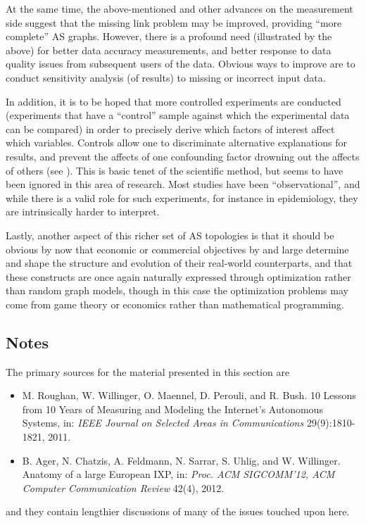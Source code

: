 At the same time, the above-mentioned and other advances on the measurement side
suggest that the missing link problem may be improved, providing
``more complete'' AS graphs. However, there is a profound need
(illustrated by the above) for better data accuracy measurements, and
better response to data quality issues from subsequent users of the
data. Obvious ways to improve are to conduct sensitivity analysis (of
results) to missing or incorrect input data. 

In addition, it is to be hoped that more controlled experiments are
conducted (\ie experiments that have a ``control'' sample against
which the experimental data can be compared) in order to precisely
derive which factors of interest affect which variables.  Controls
allow one to discriminate alternative explanations for results, and
prevent the affects of one confounding factor drowning out the affects
of others (see \cite{mao03:_bgp_beacon,bush09:_inter_optom}). This is
basic tenet of the scientific method, but seems to have been ignored
in this area of research. Most studies have been ``observational'',
and while there is a valid role for such experiments, for instance in
epidemiology, they are intrinsically harder to interpret.

Lastly, another aspect of this richer set of AS topologies is that it should be
obvious by now that economic or commercial objectives by and large determine
and shape the structure and evolution of their real-world counterparts, and that 
these constructs are once again naturally expressed through optimization rather 
than random graph models, though in this case the optimization problems may come
from game theory or economics rather than mathematical programming. 

\subsection{Notes}

The primary sources for the material presented in this section are

\begin{itemize}

\item[\cite{roughan11}] M. Roughan, W. Willinger, O. Maennel,
D. Perouli, and R. Bush. 10 Lessons from 10 Years of Measuring and Modeling the Internet's Autonomous Systems, in: {\em IEEE Journal on Selected Areas in Communications} 29(9):1810-1821, 2011.

\item[\cite{ager12:_anatom_europ_ixp}] B. Ager, N. Chatzis,
A. Feldmann, N. Sarrar, S. Uhlig, and W. Willinger. Anatomy of a
large European IXP, in: {\em Proc. ACM SIGCOMM'12, ACM Computer
Communication Review} 42(4), 2012.

\end{itemize}
and they contain lengthier discussions of many of the issues touched upon here. 

